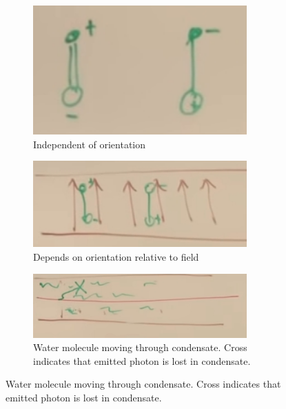 \documentclass[]{article}
\begin{document}
\begin{appendices}
	\begin{figure}[H]
		\caption{Analogy: the water molecule and its mass}\label{fig:2-a2-water-molecule}
		\begin{subfigure}[t]{0.4\textwidth}
			\caption{Independent of orientation}
			\includegraphics[width=0.9\textwidth]{2-a2-water-molecule}
		\end{subfigure}
		\begin{subfigure}[t]{0.4\textwidth}
			\caption{Depends on orientation relative to field}\label{fig:2-a2-water-molecule-in-field}
			\includegraphics[width=0.9\textwidth]{2-a2-water-molecule-in-field}
		\end{subfigure}
			\begin{subfigure}[t]{\textwidth}
		\caption{Water molecule moving through condensate. Cross indicates that emitted photon is lost in condensate.}\label{fig:2-a2-water-molecule-in-condensate}
		\includegraphics[width=0.9\textwidth]{2-a2-water-molecule-in-condensate}
	\end{subfigure}
	\end{figure}


\end{appendices}
\end{document}
